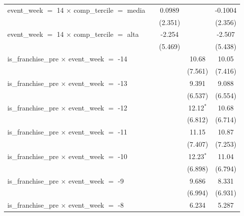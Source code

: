 \begin{tabular}{lcccc}
   event\_week $=$ 14 $\times$ comp\_tercile $=$ media     &                & 0.0989        &              & -0.1004\\   
                                                           &                & (2.351)       &              & (2.356)\\   
   event\_week $=$ 14 $\times$ comp\_tercile $=$ alta      &                & -2.254        &              & -2.507\\   
                                                           &                & (5.469)       &              & (5.438)\\   
   is\_franchise\_pre $\times$ event\_week $=$ -14         &                &               & 10.68        & 10.05\\   
                                                           &                &               & (7.561)      & (7.416)\\   
   is\_franchise\_pre $\times$ event\_week $=$ -13         &                &               & 9.391        & 9.088\\   
                                                           &                &               & (6.537)      & (6.554)\\   
   is\_franchise\_pre $\times$ event\_week $=$ -12         &                &               & 12.12$^{*}$  & 10.68\\   
                                                           &                &               & (6.812)      & (6.714)\\   
   is\_franchise\_pre $\times$ event\_week $=$ -11         &                &               & 11.15        & 10.87\\   
                                                           &                &               & (7.407)      & (7.253)\\   
   is\_franchise\_pre $\times$ event\_week $=$ -10         &                &               & 12.23$^{*}$  & 11.04\\   
                                                           &                &               & (6.898)      & (6.794)\\   
   is\_franchise\_pre $\times$ event\_week $=$ -9          &                &               & 9.686        & 8.331\\   
                                                           &                &               & (6.994)      & (6.931)\\   
   is\_franchise\_pre $\times$ event\_week $=$ -8          &                &               & 6.234        & 5.287\\   

\end{tabular}
